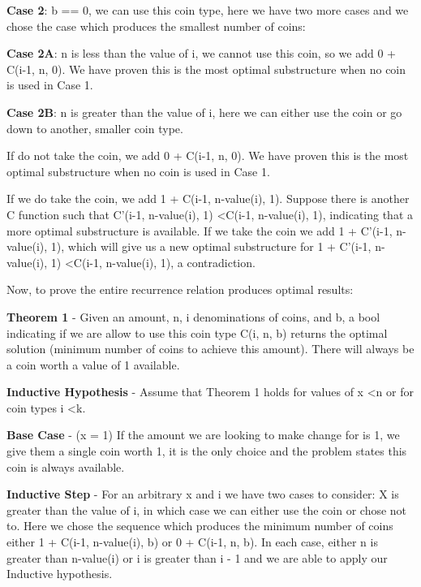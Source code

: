 \documentclass[12pt]{article}
\begin{document}
\begin{enumerate}
\begin{enumerate}
    \textbf{Case 2}: b == 0, we can use this coin type, here we have two more cases and we chose the case which produces the smallest number of coins:
    
    \textbf{Case 2A}: n is less than the value of i, we cannot use this coin, so we add 0 + C(i-1, n, 0). We have proven this is the most optimal substructure when no coin is used in Case 1.
        
    \textbf{Case 2B}: n is greater than the value of i, here we can either use the coin or go down to another, smaller coin type. 
    
    If do not take the coin, we add 0 + C(i-1, n, 0). We have proven this is the most optimal substructure when no coin is used in Case 1.
    
    If we do take the coin, we add 1 + C(i-1, n-value(i), 1). Suppose there is another C function such that C'(i-1, n-value(i), 1) \textless C(i-1, n-value(i), 1), indicating that a more optimal substructure is available. If we take the coin we add 1 + C'(i-1, n-value(i), 1), which will give us a new optimal substructure for 1 + C'(i-1, n-value(i), 1) \textless C(i-1, n-value(i), 1), a contradiction.
    
    
    
    
    Now, to prove the entire recurrence relation produces optimal results:
    
    
    \textbf{Theorem 1} - Given an amount, n, i denominations of coins, and b, a bool indicating if we are allow to use this coin type C(i, n, b) returns the optimal solution (minimum number of coins to achieve this amount). There will always be a coin worth a value of 1 available.
    
    
    \textbf{Inductive Hypothesis} - Assume that Theorem 1 holds for values of x \textless n or for coin types i \textless k.
    
    
    \textbf{Base Case} - (x = 1) If the amount we are looking to make change for is 1, we give them a single coin worth 1, it is the only choice and the problem states this coin is always available. 
    
    
    \textbf{Inductive Step} - 
    For an arbitrary x and i we have two cases to consider:
    X is greater than the value of i, in which case we can either use the coin or chose not to. Here we chose the sequence which produces the minimum number of coins either 1 + C(i-1, n-value(i), b) or 0 + C(i-1, n, b). In each case, either n is greater than n-value(i) or i is greater than i - 1 and we are able to apply our Inductive hypothesis.
     

\end{enumerate}
\end{enumerate}
\end{document}
